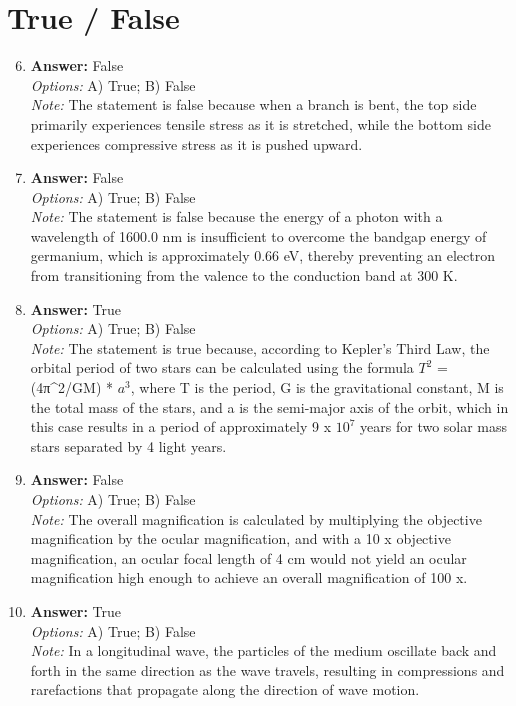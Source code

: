 \documentclass[12pt]{article}
\begin{document}
\section*{True / False}
\begin{enumerate}[label=\arabic*.]
\setcounter{enumi}{5}
\item \textbf{Answer:} False
\\ \textit{Options:} A) True; B) False
\\ \textit{Note:} The statement is false because when a branch is bent, the top side primarily experiences tensile stress as it is stretched, while the bottom side experiences compressive stress as it is pushed upward.
\item \textbf{Answer:} False
\\ \textit{Options:} A) True; B) False
\\ \textit{Note:} The statement is false because the energy of a photon with a wavelength of 1600.0 nm is insufficient to overcome the bandgap energy of germanium, which is approximately 0.66 eV, thereby preventing an electron from transitioning from the valence to the conduction band at 300 K.
\item \textbf{Answer:} True
\\ \textit{Options:} A) True; B) False
\\ \textit{Note:} The statement is true because, according to Kepler's Third Law, the orbital period of two stars can be calculated using the formula $T^2$ = (4π^2/GM) * $a^3$, where T is the period, G is the gravitational constant, M is the total mass of the stars, and a is the semi-major axis of the orbit, which in this case results in a period of approximately 9 x $10^7$ years for two solar mass stars separated by 4 light years.
\item \textbf{Answer:} False
\\ \textit{Options:} A) True; B) False
\\ \textit{Note:} The overall magnification is calculated by multiplying the objective magnification by the ocular magnification, and with a 10 x objective magnification, an ocular focal length of 4 cm would not yield an ocular magnification high enough to achieve an overall magnification of 100 x.
\item \textbf{Answer:} True
\\ \textit{Options:} A) True; B) False
\\ \textit{Note:} In a longitudinal wave, the particles of the medium oscillate back and forth in the same direction as the wave travels, resulting in compressions and rarefactions that propagate along the direction of wave motion.
\end{enumerate}
\end{document}
